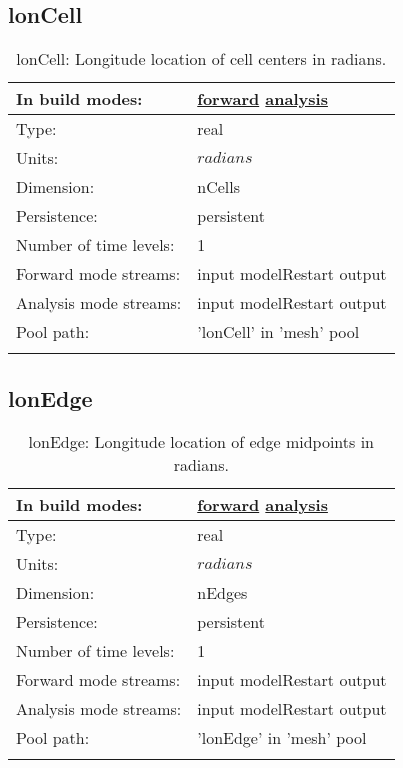 \subsection[lonCell]{lonCell}
\label{subsec:var_sec_mesh_lonCell}
\begin{center}
\begin{longtable}{| p{2.0in} | p{4.0in} |}
        \hline 
        In build modes: & \hyperref[subsec:forward_var_tab_mesh]{forward} \hyperref[subsec:analysis_var_tab_mesh]{analysis} \\
        \hline 
        Type: & real \\
        \hline 
        Units: & $radians$ \\
        \hline 
        Dimension: & nCells \\
        \hline 
        Persistence: & persistent \\
        \hline 
        Number of time levels: & 1 \\
        \hline 
		 Forward mode streams: &  input modelRestart output \\
        \hline 
		 Analysis mode streams: &  input modelRestart output \\
        \hline 
            Pool path: & 'lonCell' in 'mesh' pool
 \\
		 \hline 
    \caption{lonCell: Longitude location of cell centers in radians.}
\end{longtable}
\end{center}
\subsection[lonEdge]{lonEdge}
\label{subsec:var_sec_mesh_lonEdge}
\begin{center}
\begin{longtable}{| p{2.0in} | p{4.0in} |}
        \hline 
        In build modes: & \hyperref[subsec:forward_var_tab_mesh]{forward} \hyperref[subsec:analysis_var_tab_mesh]{analysis} \\
        \hline 
        Type: & real \\
        \hline 
        Units: & $radians$ \\
        \hline 
        Dimension: & nEdges \\
        \hline 
        Persistence: & persistent \\
        \hline 
        Number of time levels: & 1 \\
        \hline 
		 Forward mode streams: &  input modelRestart output \\
        \hline 
		 Analysis mode streams: &  input modelRestart output \\
        \hline 
            Pool path: & 'lonEdge' in 'mesh' pool
 \\
		 \hline 
    \caption{lonEdge: Longitude location of edge midpoints in radians.}
\end{longtable}
\end{center}
